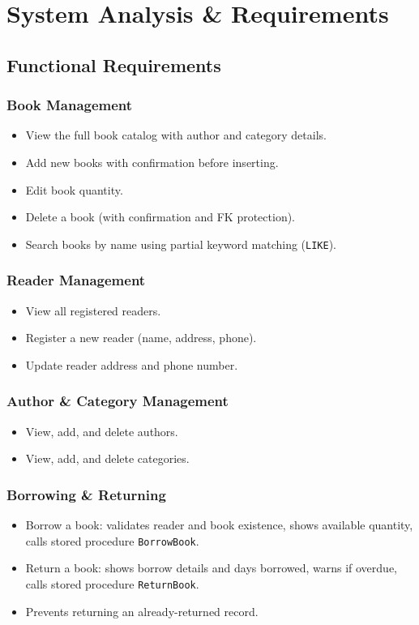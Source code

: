 \documentclass[12pt,a4paper,oneside]{report}
\begin{document}
\chapter{System Analysis \& Requirements}

\section{Functional Requirements}

\subsection*{Book Management}
\begin{itemize}
  \item View the full book catalog with author and category details.
  \item Add new books with confirmation before inserting.
  \item Edit book quantity.
  \item Delete a book (with confirmation and FK protection).
  \item Search books by name using partial keyword matching (\texttt{LIKE}).
\end{itemize}

\subsection*{Reader Management}
\begin{itemize}
  \item View all registered readers.
  \item Register a new reader (name, address, phone).
  \item Update reader address and phone number.
\end{itemize}

\subsection*{Author \& Category Management}
\begin{itemize}
  \item View, add, and delete authors.
  \item View, add, and delete categories.
\end{itemize}

\subsection*{Borrowing \& Returning}
\begin{itemize}
  \item Borrow a book: validates reader and book existence, shows available quantity,
        calls stored procedure \texttt{BorrowBook}.
  \item Return a book: shows borrow details and days borrowed, warns if overdue,
        calls stored procedure \texttt{ReturnBook}.
  \item Prevents returning an already-returned record.
\end{itemize}
\end{document}
